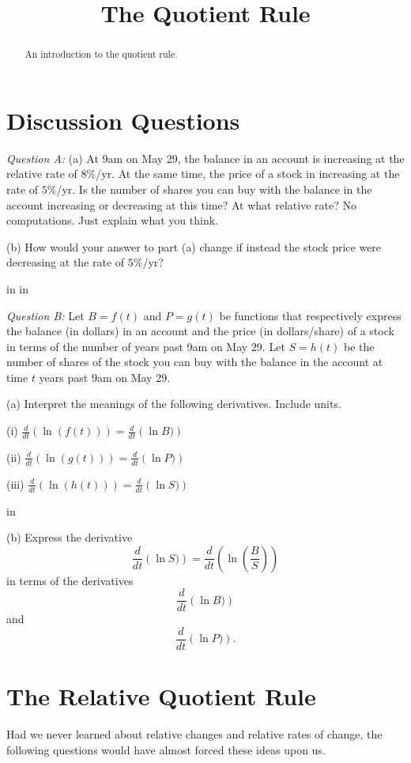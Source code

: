 \documentclass{ximera}
\title{The Quotient Rule}
\newcommand{\pskip}{\vskip 0.1 in}
\begin{document}
\begin{abstract}
An introduction to the quotient rule.
\end{abstract}
\maketitle

\section*{Discussion Questions}

\emph{Question A:} (a) At 9am on May 29, the balance in an account is increasing at the relative rate of $8\%$/yr. At the same time, the price of a stock in increasing at the rate of $5\%$/yr. Is the number of shares you can buy with the balance in the account increasing or decreasing at this time? At what relative rate? No computations. Just explain what you think.

(b) How would your answer to part (a) change if instead the stock price were decreasing at the rate of $5\%$/yr?

\pskip \pskip

\emph{Question B:} Let $B = f(t)$ and $P=g(t)$ be functions that respectively express the balance (in dollars) in an account and the price (in dollars/share) of a stock in terms of the number of years past 9am on May 29. Let $S= h(t)$ be the number of shares of the stock you can buy with the balance in the account at time $t$ years past 9am on May 29.

(a) Interpret the meanings of the following derivatives. Include units.

(i) $\frac{d}{dt} \left( \ln (f(t)) \right) = \frac{d}{dt} \left( \ln B) \right)$
 
(ii) $\frac{d}{dt} \left( \ln (g(t)) \right) = \frac{d}{dt} \left( \ln P) \right)$

(iii) $\frac{d}{dt} \left( \ln (h(t)) \right) = \frac{d}{dt} \left( \ln S) \right)$

\pskip

(b) Express the derivative
\[
 \frac{d}{dt} \left( \ln S) \right) =  \frac{d}{dt} \left( \ln  \left( \frac{B}{S}\right) \right)
\]
in terms of the derivatives
\[
 \frac{d}{dt} \left( \ln B) \right)
\]
and
\[
   \frac{d}{dt} \left( \ln P) \right) .
\]


\section*{The Relative Quotient Rule}
Had we never learned about relative changes and relative rates of change, the following questions would have almost forced these ideas upon us.
\end{document}
